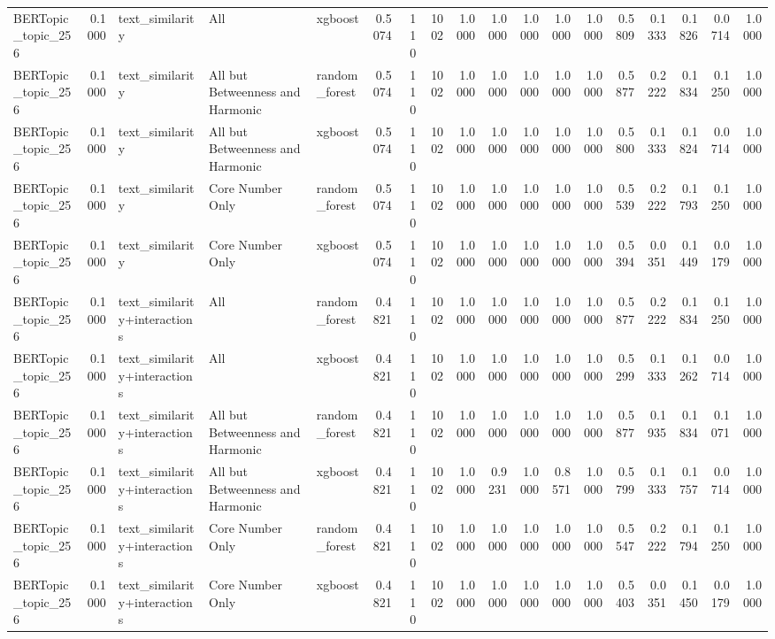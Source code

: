 \begin{tabular}{lrlllrrrrrrrrrrrrr}
BERTopic_topic_256 & 0.1000 & text_similarity & All & xgboost & 0.5074 & 110 & 1002 & 1.0000 & 1.0000 & 1.0000 & 1.0000 & 1.0000 & 0.5809 & 0.1333 & 0.1826 & 0.0714 & 1.0000 \\
BERTopic_topic_256 & 0.1000 & text_similarity & All but Betweenness and Harmonic & random_forest & 0.5074 & 110 & 1002 & 1.0000 & 1.0000 & 1.0000 & 1.0000 & 1.0000 & 0.5877 & 0.2222 & 0.1834 & 0.1250 & 1.0000 \\
BERTopic_topic_256 & 0.1000 & text_similarity & All but Betweenness and Harmonic & xgboost & 0.5074 & 110 & 1002 & 1.0000 & 1.0000 & 1.0000 & 1.0000 & 1.0000 & 0.5800 & 0.1333 & 0.1824 & 0.0714 & 1.0000 \\
BERTopic_topic_256 & 0.1000 & text_similarity & Core Number Only & random_forest & 0.5074 & 110 & 1002 & 1.0000 & 1.0000 & 1.0000 & 1.0000 & 1.0000 & 0.5539 & 0.2222 & 0.1793 & 0.1250 & 1.0000 \\
BERTopic_topic_256 & 0.1000 & text_similarity & Core Number Only & xgboost & 0.5074 & 110 & 1002 & 1.0000 & 1.0000 & 1.0000 & 1.0000 & 1.0000 & 0.5394 & 0.0351 & 0.1449 & 0.0179 & 1.0000 \\
BERTopic_topic_256 & 0.1000 & text_similarity+interactions & All & random_forest & 0.4821 & 110 & 1002 & 1.0000 & 1.0000 & 1.0000 & 1.0000 & 1.0000 & 0.5877 & 0.2222 & 0.1834 & 0.1250 & 1.0000 \\
BERTopic_topic_256 & 0.1000 & text_similarity+interactions & All & xgboost & 0.4821 & 110 & 1002 & 1.0000 & 1.0000 & 1.0000 & 1.0000 & 1.0000 & 0.5299 & 0.1333 & 0.1262 & 0.0714 & 1.0000 \\
BERTopic_topic_256 & 0.1000 & text_similarity+interactions & All but Betweenness and Harmonic & random_forest & 0.4821 & 110 & 1002 & 1.0000 & 1.0000 & 1.0000 & 1.0000 & 1.0000 & 0.5877 & 0.1935 & 0.1834 & 0.1071 & 1.0000 \\
BERTopic_topic_256 & 0.1000 & text_similarity+interactions & All but Betweenness and Harmonic & xgboost & 0.4821 & 110 & 1002 & 1.0000 & 0.9231 & 1.0000 & 0.8571 & 1.0000 & 0.5799 & 0.1333 & 0.1757 & 0.0714 & 1.0000 \\
BERTopic_topic_256 & 0.1000 & text_similarity+interactions & Core Number Only & random_forest & 0.4821 & 110 & 1002 & 1.0000 & 1.0000 & 1.0000 & 1.0000 & 1.0000 & 0.5547 & 0.2222 & 0.1794 & 0.1250 & 1.0000 \\
BERTopic_topic_256 & 0.1000 & text_similarity+interactions & Core Number Only & xgboost & 0.4821 & 110 & 1002 & 1.0000 & 1.0000 & 1.0000 & 1.0000 & 1.0000 & 0.5403 & 0.0351 & 0.1450 & 0.0179 & 1.0000 \\

\end{tabular}
